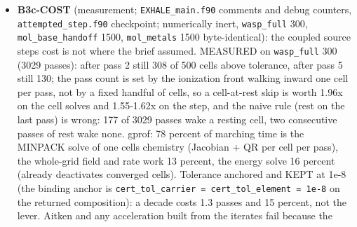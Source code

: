\documentclass[english,a4paper]{my_memo}
\begin{document}
\begin{itemize}
  the acceleration has to come from \texttt{dc/dT\ =\ -(dF/dc)\^{}-1\ (dF/dT)} against
  the factorization \texttt{hybrd} already forms, not from the iterates.
  ALSO FIXED, a defect of my own file found outside the task: the run\textquotesingle s cost
  line divided passes accumulated over every ENTRY of the coupled loop by the
  number of adopted STEPS, two different populations, so it could report a
  mean above the worst single entry (MEASURED on the control, \texttt{wasp\_full} 300
  in \texttt{phys} mode: "13.98 passes per step on average, worst 11"). It now
  divides by the entries and names them. ALSO: \texttt{heat\_channel\_state} is in the
  attempted-step checkpoint (save/restore/compare/perturb), the four lines
  HEATBRK\textquotesingle s report asked for, with two assertions RED on the control (the
  moved array is not seen, and the restore leaves it 3.0 off). Tests:
  \texttt{coupled\_source\_step} 36/0 (33 before), \texttt{attempted\_step} 97/0 (95 before).
  Impact, control = the same tree snapshot with this item\textquotesingle s two production
  files reverted: \texttt{wasp\_full} 300, \texttt{mol\_base\_handoff} 1500 and \texttt{mol\_metals}
  1500 all \textbf{byte-identical} in \texttt{Hydro\_ioniz.txt} and \texttt{Ion\_species.txt}.
\item
  \textbf{B3c-COST} (measurement; \texttt{EXHALE\_main.f90} comments and debug counters,
  \texttt{attempted\_step.f90} checkpoint; numerically inert, \texttt{wasp\_full} 300,
  \texttt{mol\_base\_handoff} 1500, \texttt{mol\_metals} 1500 byte-identical): the coupled
  source step\textquotesingle s cost is not where the brief assumed. MEASURED on \texttt{wasp\_full}
  300 (3029 passes): after pass 2 still 308 of 500 cells above tolerance,
  after pass 5 still 130; the pass count is set by the ionization front
  walking inward one cell per pass, not by a fixed handful of cells, so a
  cell-at-rest skip is worth 1.96x on the cell solves and 1.55-1.62x on the
  step, and the naive rule (rest on the last pass) is wrong: 177 of 3029
  passes wake a resting cell, two consecutive passes of rest wake none.
  gprof: 78 percent of marching time is the MINPACK solve of one cell\textquotesingle s
  chemistry (Jacobian + QR per cell per pass), the whole-grid field and
  rate work 13 percent, the energy solve 16 percent (already deactivates
  converged cells). Tolerance anchored and KEPT at 1e-8 (the binding anchor
  is \texttt{cert\_tol\_carrier\ =\ cert\_tol\_element\ =\ 1e-8} on the returned
  composition): a decade costs 1.3 passes and 15 percent, not the lever.
  Aitken and any acceleration built from the iterates fail because the

\end{itemize}
\end{document}
